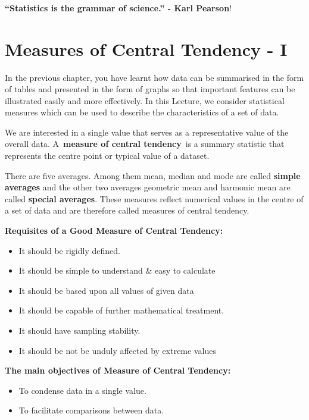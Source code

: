 \documentclass[
]{book}
\begin{document}
~\\
\strut ~\\
\strut ~

\label{hello}
\textbf{``Statistics is the grammar of science.'' - Karl Pearson}!

\chapter{Measures of Central Tendency - I}\label{measures-of-central-tendency---i}

In the previous chapter, you have learnt how data can be summarised in
the form of tables and presented in the form of graphs so that important
features can be illustrated easily and more effectively. In this
Lecture, we consider statistical measures which can be used to describe
the characteristics of a set of data.

We are interested in a single value that serves as a representative
value of the overall data. A~\textbf{measure of central tendency}~is a
summary statistic that represents the centre point or typical value of a
dataset.

There are five averages. Among them mean, median and mode are called
\textbf{simple averages} and the other two averages geometric mean and
harmonic mean are called \textbf{special averages}. These measures reflect
numerical values in the centre of a set of data and are therefore called
measures of central tendency.

{\textbf{Requisites of a Good Measure of Central Tendency:}}

\begin{itemize}
\item
  It should be rigidly defined.
\item
  It should be simple to understand \& easy to calculate
\item
  It should be based upon all values of given data
\item
  It should be capable of further mathematical treatment.
\item
  It should have sampling stability.
\item
  It should be not be unduly affected by extreme values
\end{itemize}

\textbf{The main objectives of Measure of Central Tendency:}

\begin{itemize}
\item
  To condense data in a single value.
\item
  To facilitate comparisons between data.
\end{itemize}
\end{document}
